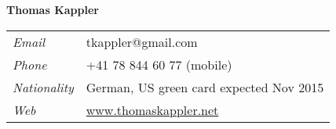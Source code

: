 
\renewcommand{\thefootnote}{\fnsymbol{footnote}}

\begin{center}
{\large
\textbf{Thomas Kappler}
}
\end{center}



\begin{center}
\begin{tabular}[b]{ll}
  \emph{Email} & tkappler@gmail.com\\
  \emph{Phone} & +41 78 844 60 77 (mobile)\\
  \emph{Nationality} & German, US green card expected Nov 2015\\
  \emph{Web} & \href{http://www.thomaskappler.net/}{www.thomaskappler.net}
\end{tabular}
\end{center}

\vspace{0.2cm}

